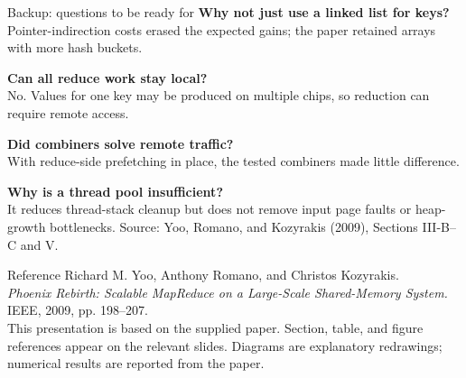 \documentclass[aspectratio=169,11pt]{beamer}
\newcommand{\src}[1]{\vfill{\tiny\color{gray}Source: Yoo, Romano, and Kozyrakis (2009), #1.}}
\begin{document}
\begin{frame}{Backup: questions to be ready for}
\small
\textbf{Why not just use a linked list for keys?}\\
Pointer-indirection costs erased the expected gains; the paper retained arrays with more hash buckets.\medskip

\textbf{Can all reduce work stay local?}\\
No. Values for one key may be produced on multiple chips, so reduction can require remote access.\medskip

\textbf{Did combiners solve remote traffic?}\\
With reduce-side prefetching in place, the tested combiners made little difference.\medskip

\textbf{Why is a thread pool insufficient?}\\
It reduces thread-stack cleanup but does not remove input page faults or heap-growth bottlenecks.
\src{Sections III-B--C and V}
\end{frame}

\begin{frame}{Reference}
\small
Richard M. Yoo, Anthony Romano, and Christos Kozyrakis.\\[.2cm]
\emph{Phoenix Rebirth: Scalable MapReduce on a Large-Scale Shared-Memory System.}\\[.2cm]
IEEE, 2009, pp. 198--207.\\[.5cm]
This presentation is based on the supplied paper. Section, table, and figure references appear on the relevant slides. Diagrams are explanatory redrawings; numerical results are reported from the paper.
\end{frame}
\end{document}
